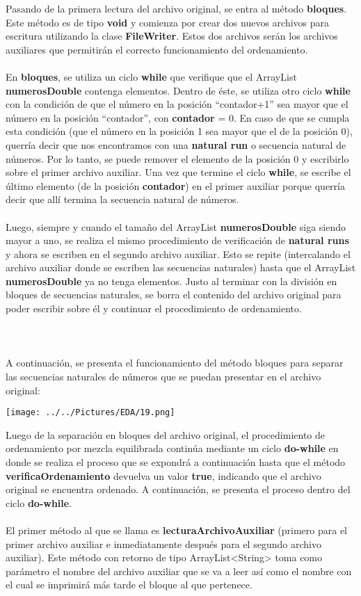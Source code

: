 \documentclass[12pt,letterpaper]{report}
\begin{document}
Pasando de la primera lectura del archivo original, se entra al método \textbf{bloques}. Este método es de tipo \textbf{void} y comienza por crear dos nuevos archivos para escritura utilizando la clase \textbf{FileWriter}. Estos dos archivos serán los archivos auxiliares que permitirán el correcto funcionamiento del ordenamiento.\\\\ En \textbf{bloques}, se utiliza un ciclo \textbf{while} que verifique que el ArrayList \textbf{numerosDouble} contenga elementos. Dentro de éste, se utiliza otro ciclo \textbf{while} con la condición de que el número en la posición “contador+1” sea mayor que el número en la posición “contador”, con \textbf{contador} = 0. En caso de que se cumpla esta condición (que el número en la posición 1 sea mayor que el de la posición 0), querría decir que nos encontramos con una \textbf{natural run} o secuencia natural de números. Por lo tanto, se puede remover el elemento de la posición 0 y escribirlo sobre el primer archivo auxiliar. Una vez que termine el ciclo \textbf{while}, se escribe el último elemento (de la posición \textbf{contador}) en el primer auxiliar porque querría decir que allí termina la secuencia natural de números.\\\\ Luego, siempre y cuando el tamaño del ArrayList \textbf{numerosDouble} siga siendo mayor a uno, se realiza el mismo procedimiento de verificación de \textbf{natural runs} y ahora se escriben en el segundo archivo auxiliar. Esto se repite (intercalando el archivo auxiliar donde se escriben las secuencias naturales) hasta que el ArrayList \textbf{numerosDouble} ya no tenga elementos. Justo al terminar con la división en bloques de secuencias naturales, se borra el contenido del archivo original para poder escribir sobre él y continuar el procedimiento de ordenamiento.\\\\\\\\
A continuación, se presenta el funcionamiento del método bloques para separar las secuencias naturales de números que se puedan presentar en el archivo original: 
\begin{center}
\texttt{[image: ../../Pictures/EDA/19.png]} 
\end{center}
Luego de la separación en bloques del archivo original, el procedimiento de ordenamiento por mezcla equilibrada continúa mediante un ciclo \textbf{do-while} en donde se realiza el proceso que se expondrá a continuación hasta que el método \textbf{verificaOrdenamiento} devuelva un valor \textbf{true}, indicando que el archivo original se encuentra ordenado. A continuación, se presenta el proceso dentro del ciclo \textbf{do-while}.\\\\El primer método al que se llama es \textbf{lecturaArchivoAuxiliar} (primero para el primer archivo auxiliar e inmediatamente después para el segundo archivo auxiliar). Este método con retorno de tipo ArrayList<String> toma como parámetro el nombre del archivo auxiliar que se va a leer así como el nombre con el cual se imprimirá más tarde el bloque al que pertenece.\\\\
\end{document}
